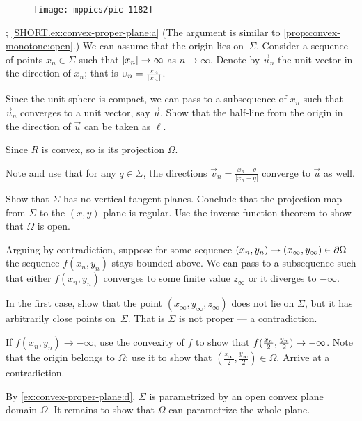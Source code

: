 \begin{multicols}{2}
\begin{wrapfigure}{r}{29 mm}
\vskip-4mm
\centering
\texttt{[image: mppics/pic-1182]}
\vskip-3mm
\end{wrapfigure}

\parbf{\ref{ex:convex-proper-plane}}; \ref{SHORT.ex:convex-proper-plane:a}
(The argument is similar to \ref{prop:convex-monotone:open}.)
We can assume that the origin lies on~$\Sigma$.
Consider a sequence of points $x_n\in \Sigma$ such that $|x_n|\z\to \infty$ as $n\to \infty$.
Denote by $\vec u_n$ the unit vector in the direction of $x_n$; that is $\vec u_n\z=\tfrac{x_n}{|x_n|}$.

Since the unit sphere is compact, we can pass to a subsequence of $x_n$ such that $\vec u_n$ converges to a unit vector, say $\vec u$.
Show that the half-line from the origin in the direction of $\vec u$ can be taken as $\ell$.

Since $R$ is convex, so is its projection $\Omega$.

Note and use that for any $q\in \Sigma$, the directions $\vec v_n=\tfrac{x_n-q}{|x_n-q|}$ converge to $\vec u$ as well.

Show that $\Sigma$ has no vertical tangent planes.
Conclude that the projection map from $\Sigma$ to the $(x,y)$-plane is regular.
Use the inverse function theorem to show that $\Omega$ is open.


Arguing by contradiction, suppose for some sequence $(x_n,y_n)\z\to(x_\infty,y_\infty)\in \partial\Omega$ the sequence $f(x_n,y_n)$ stays bounded above.
We can pass to a subsequence such that either $f(x_n,y_n)$ converges to some finite value $z_\infty$ or it diverges to $-\infty$.

In the first case, show that the point $(x_\infty, y_\infty,z_\infty)$ does not lie on $\Sigma$, but it has arbitrarily close points on~$\Sigma$.
That is $\Sigma$ is not proper --- a contradiction.

If $f(x_n,y_n)\to -\infty$, use the convexity of $f$ to show that $f(\tfrac{x_n}2 ,\tfrac{y_n}2)\z\to -\infty$.
Note that the origin belongs to $\Omega$;
use it to show that $(\tfrac{x_\infty}2, \tfrac{y_\infty}2)\in\Omega$.
Arrive at a contradiction.

By \ref{ex:convex-proper-plane:d}, $\Sigma$ is parametrized by an open convex plane domain $\Omega$.
It remains to show that $\Omega$ can parametrize the whole plane.


\end{multicols}
